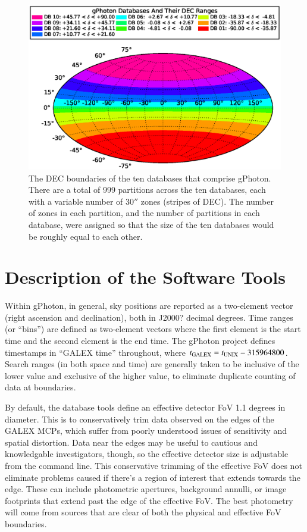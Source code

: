 \documentclass[5p]{elsarticle}
\begin{document}
\begin{figure}
\includegraphics[scale=0.48]{FigDBDist.eps}
\caption{The DEC boundaries of the ten databases that comprise gPhoton.  There are a total of 999 partitions across the ten databases, each with a variable number of $30''$ zones (stripes of DEC).  The number of zones in each partition, and the number of partitions in each database, were assigned so that the size of the ten databases would be roughly equal to each other. \label{dbdist}}
\end{figure}

\section{Description of the Software Tools}
\label{softwaretools}
Within gPhoton, in general, sky positions are reported as a two-element vector (right ascension and declination), both in {\color{red}J2000?} decimal degrees. Time ranges (or ``bins'') are defined as two-element vectors where the first element is the start time and the second element is the end time. The gPhoton project defines timestamps in ``GALEX time'' throughout, where $t_{\rm{GALEX}} = t_{\rm{UNIX}} - 315964800$. Search ranges (in both space and time) are generally taken to be inclusive of the lower value and exclusive of the higher value, to eliminate duplicate counting of data at boundaries.

By default, the database tools define an effective detector FoV 1.1 degrees in diameter. This is to conservatively trim data observed on the edges of the GALEX MCPs, which suffer from poorly understood issues of sensitivity and spatial distortion. Data near the edges may be useful to cautious and knowledgable investigators, though, so the effective detector size is adjustable from the command line. This conservative trimming of the effective FoV does not eliminate problems caused if there's a region of interest that extends towards the edge.  These can include photometric apertures, background annulli, or image footprints that extend past the edge of the effective FoV.  The best photometry will come from sources that are clear of both the physical and effective FoV boundaries.
\end{document}
